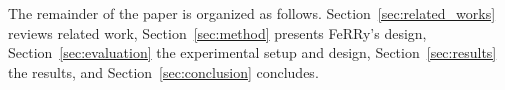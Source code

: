 \documentclass[conference]{IEEEtran}
\newcommand{\sysname}{FeRRy}
\begin{document}
The remainder of the paper is organized as follows.  Section~\ref{sec:related_works} reviews related work,
Section~\ref{sec:method} presents \sysname{}'s design,
Section~\ref{sec:evaluation} the experimental setup and design,
Section~\ref{sec:results} the results, and Section~\ref{sec:conclusion}
concludes.


\newcommand{\cmarkc}{\cellcolor{goodgreen}\textcolor{black!55}{\scriptsize$\checkmark$}}
\newcommand{\xmarkc}{\cellcolor{badred}\textcolor{black!40}{\scriptsize$\times$}}
\newcommand{\tmarkc}{\cellcolor{nayellow}\textcolor{black!65}{\scriptsize$\triangle$}}
\newcommand{\cmarkF}{\cellcolor{ferrygreen}\textcolor{white}{\textbf{\scriptsize$\checkmark$}}}
\end{document}
